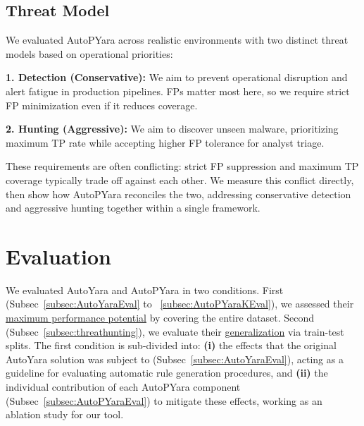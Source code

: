 \vspace{-3mm}
\subsection{Threat Model}
\vspace{-2mm}

\noindent We evaluated AutoPYara across realistic environments with two distinct threat models based on operational priorities:


\noindent\textbf{1. Detection (Conservative):} We aim to prevent operational disruption and alert fatigue in production pipelines. FPs matter most here, so we require strict FP minimization even if it reduces coverage.

\noindent\textbf{2. Hunting (Aggressive):} We aim to discover unseen malware, prioritizing maximum TP rate while accepting higher FP tolerance for analyst triage.


These requirements are often conflicting: strict FP suppression and maximum TP coverage typically trade off against each other. We measure this conflict directly, then show how AutoPYara reconciles the two, addressing conservative detection and aggressive hunting together within a single framework.



\vspace{-3.0mm}

\section{Evaluation}
\label{sec:eval}
\vspace{-2.0mm}


\noindent We evaluated AutoYara and AutoPYara in two conditions. First (Subsec~\ref{subsec:AutoYaraEval} to ~\ref{subsec:AutoPYaraKEval}), we assessed their \uline{maximum performance potential} by covering the entire dataset. Second (Subsec~\ref{subsec:threathunting}), we evaluate their \uline{generalization} via train-test splits. The first condition is sub-divided into: \textbf{(i)} the effects that the original AutoYara solution was subject to (Subsec~\ref{subsec:AutoYaraEval}), acting as a guideline for evaluating automatic rule generation procedures, and \textbf{(ii)} the individual contribution of each AutoPYara component (Subsec~\ref{subsec:AutoPYaraEval}) to mitigate these effects, working as an ablation study for our tool.

